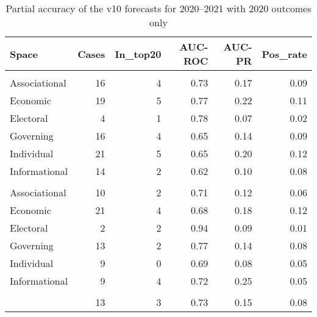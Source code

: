 \begin{table}

\caption{\label{tab:v10-acc}Partial accuracy of the v10 forecasts for 2020--2021 with 2020 outcomes only}
\centering
\begin{tabular}[t]{lrrrrr}
\toprule
Space & Cases & In\_top20 & AUC-ROC & AUC-PR & Pos\_rate\\
\midrule
\addlinespace[0.3em]
\multicolumn{6}{l}{\textbf{Downards movement}}\\
\hspace{1em}Associational & 16 & 4 & 0.73 & 0.17 & 0.09\\
\hspace{1em}Economic & 19 & 5 & 0.77 & 0.22 & 0.11\\
\hspace{1em}Electoral & 4 & 1 & 0.78 & 0.07 & 0.02\\
\hspace{1em}Governing & 16 & 4 & 0.65 & 0.14 & 0.09\\
\hspace{1em}Individual & 21 & 5 & 0.65 & 0.20 & 0.12\\
\hspace{1em}Informational & 14 & 2 & 0.62 & 0.10 & 0.08\\
\addlinespace[0.3em]
\multicolumn{6}{l}{\textbf{Upwards movement}}\\
\hspace{1em}Associational & 10 & 2 & 0.71 & 0.12 & 0.06\\
\hspace{1em}Economic & 21 & 4 & 0.68 & 0.18 & 0.12\\
\hspace{1em}Electoral & 2 & 2 & 0.94 & 0.09 & 0.01\\
\hspace{1em}Governing & 13 & 2 & 0.77 & 0.14 & 0.08\\
\hspace{1em}Individual & 9 & 0 & 0.69 & 0.08 & 0.05\\
\hspace{1em}Informational & 9 & 4 & 0.72 & 0.25 & 0.05\\
\addlinespace[0.3em]
\multicolumn{6}{l}{\textbf{Average}}\\
\hspace{1em} & 13 & 3 & 0.73 & 0.15 & 0.08\\
\bottomrule
\end{tabular}
\end{table}
